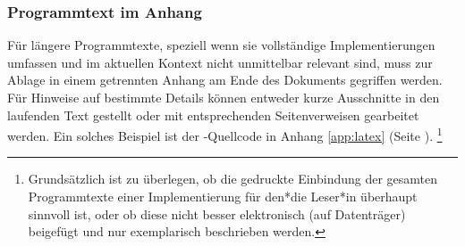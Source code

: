 \subsubsection{Programmtext im Anhang}

Für längere Programmtexte, speziell wenn sie vollständige Implementierungen
umfassen und im aktuellen Kontext nicht unmittelbar relevant sind, muss zur
Ablage in einem getrennten Anhang am Ende des Dokuments gegriffen werden. Für
Hinweise auf bestimmte Details können entweder kurze Ausschnitte in den
laufenden Text gestellt oder mit entsprechenden Seitenverweisen gearbeitet
werden. Ein solches Beispiel ist der \latex-Quellcode in Anhang
\ref{app:latex} (Seite \pageref{app:latex}).%
\footnote{Grundsätzlich ist zu überlegen, ob die gedruckte Einbindung der
gesamten Programmtexte einer Implementierung für den*die Leser*in überhaupt
sinnvoll ist, oder ob diese nicht besser elektronisch (auf Datenträger)
beigefügt und nur exemplarisch beschrieben werden.}

